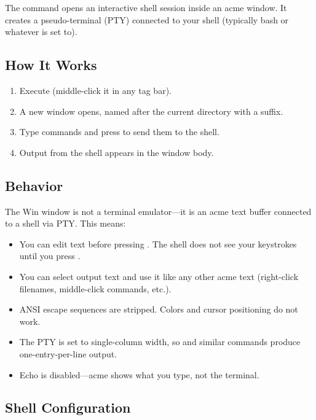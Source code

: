 
The  command opens an interactive shell session inside an acme
window.  It creates a pseudo-terminal (PTY) connected to your shell
(typically bash or whatever  is set to).

\subsection{How It Works}

\begin{enumerate}
\item Execute  (middle-click it in any tag bar).
\item A new window opens, named after the current directory with a
       suffix.
\item Type commands and press  to send them to the shell.
\item Output from the shell appears in the window body.
\end{enumerate}

\subsection{Behavior}

The Win window is not a terminal emulator---it is an acme text buffer
connected to a shell via PTY.  This means:

\begin{itemize}
\item You can edit text before pressing .  The shell does not
      see your keystrokes until you press .
\item You can select output text and use it like any other acme text
      (right-click filenames, middle-click commands, etc.).
\item ANSI escape sequences are stripped.  Colors and cursor positioning
      do not work.
\item The PTY is set to single-column width, so  and similar
      commands produce one-entry-per-line output.
\item Echo is disabled---acme shows what you type, not the terminal.
\end{itemize}

\subsection{Shell Configuration}

